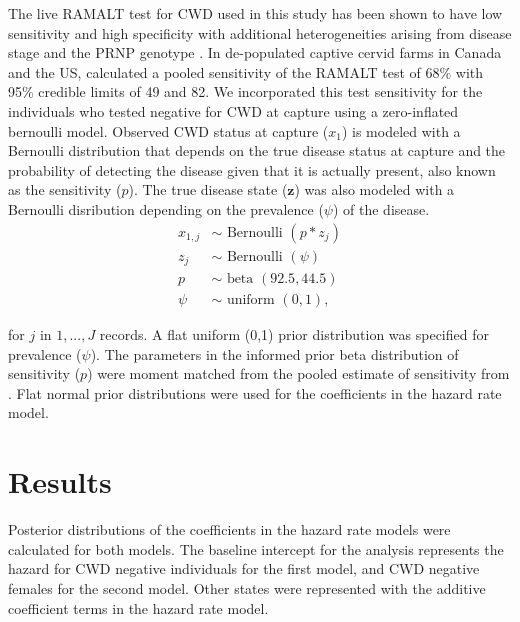 \documentclass[12pt]{article}\usepackage[]{graphicx}\usepackage[]{color}
\begin{document}
The live RAMALT test for CWD used in this study has been shown to have low sensitivity and high specificity with additional heterogeneities arising from disease stage and the PRNP genotype \citep{thomsen_diagnostic_2012}. In de-populated captive cervid farms in Canada and the US, \citet{thomsen_diagnostic_2012} calculated a pooled sensitivity of the RAMALT test of 68\% with 95\% credible limits of 49 and 82. We incorporated this test sensitivity for the individuals who tested negative for CWD at capture using a zero-inflated bernoulli model. Observed CWD status at capture ($x_1$) is modeled with a Bernoulli distribution that depends on the true disease status at capture and the probability of detecting the disease given that it is actually present, also known as the sensitivity ($p$). The true disease state ($\bm{z}$) was also modeled with a Bernoulli disribution depending on the prevalence ($\psi$) of the disease.
\begin{align}
    x_{1,j} & \sim \text{ Bernoulli }(p *z_j)\\
    z_j & \sim \text{ Bernoulli }(\psi)\\
    p & \sim \text{ beta }(92.5,44.5)\\
    \psi & \sim \text{ uniform }(0,1),
\end{align}

\noindent for $j$ in $1,...,J$ records. A flat uniform (0,1) prior distribution was specified for prevalence ($\psi$). The parameters in the informed prior beta distribution of sensitivity ($p$) were moment matched \citep{hobbs_bayesian_2015} from the pooled estimate of sensitivity from \citet{thomsen_diagnostic_2012}. Flat normal prior distributions were used for the coefficients in the hazard rate model.



\section{Results}

Posterior distributions of the coefficients in the hazard rate models were calculated for both models. The baseline intercept for the analysis represents the hazard for CWD negative individuals for the first model, and CWD negative females for the second model. Other states were represented with the additive coefficient terms in the hazard rate model.
\end{document}
